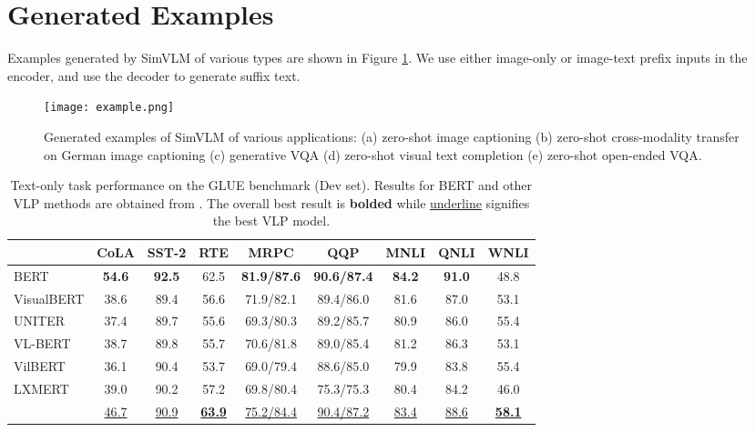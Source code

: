 \documentclass{article} \usepackage{iclr2022_conference,times}
\newcommand{\ours}{SimVLM}
\begin{document}



\clearpage
\appendix

\section{Generated Examples}
\label{appendix:examples}
Examples generated by {\ours} of various types are shown in Figure \ref{fig:example}. We use either image-only or image-text prefix inputs in the encoder, and use the decoder to generate suffix text.

\begin{figure}[t!]
\begin{center}
\texttt{[image: example.png]}
\end{center}
\caption{Generated examples of {\ours} of various applications: (a) zero-shot image captioning (b) zero-shot cross-modality transfer on German image captioning (c) generative VQA (d) zero-shot visual text completion (e) zero-shot open-ended VQA.}
\label{fig:example}
\end{figure}


\begin{table*}[t!]
\begin{center}
\begin{tabular}{l | c c c c c c c c}
\toprule
& CoLA & SST-2 & RTE & MRPC & QQP & MNLI & QNLI & WNLI \\
\bottomrule
\toprule
BERT & \bf 54.6 & \bf 92.5 & 62.5 & \bf 81.9/87.6 & \bf 90.6/87.4 & \bf 84.2 & \bf 91.0 & 48.8\\
\bottomrule
\toprule
VisualBERT & 38.6 & 89.4 & 56.6 & 71.9/82.1 & 89.4/86.0 & 81.6 & 87.0 & 53.1 \\
UNITER & 37.4 & 89.7 & 55.6 & 69.3/80.3 & 89.2/85.7 & 80.9 & 86.0 & 55.4 \\
VL-BERT & 38.7 & 89.8 & 55.7 & 70.6/81.8 & 89.0/85.4 & 81.2 & 86.3 & 53.1 \\
VilBERT & 36.1 & 90.4 & 53.7 & 69.0/79.4 & 88.6/85.0 & 79.9 & 83.8 & 55.4 \\
LXMERT & 39.0 & 90.2 & 57.2 & 69.8/80.4 & 75.3/75.3 & 80.4 & 84.2 & 46.0 \\
 & \underline{46.7} & \underline{90.9} & \bf \underline{63.9} & \underline{75.2/84.4} & \underline{90.4/87.2} & \underline{83.4} & \underline{88.6} & \bf \underline{58.1} \\
\bottomrule
\end{tabular}
\end{center}
\caption[caption]{Text-only task performance on the GLUE benchmark (Dev set). Results for BERT and other VLP methods are obtained from \cite{iki2021effect}. The overall best result is \textbf{bolded} while \underline{underline} signifies the best VLP model.} 
\label{tab:glue}
\end{table*}
\end{document}
